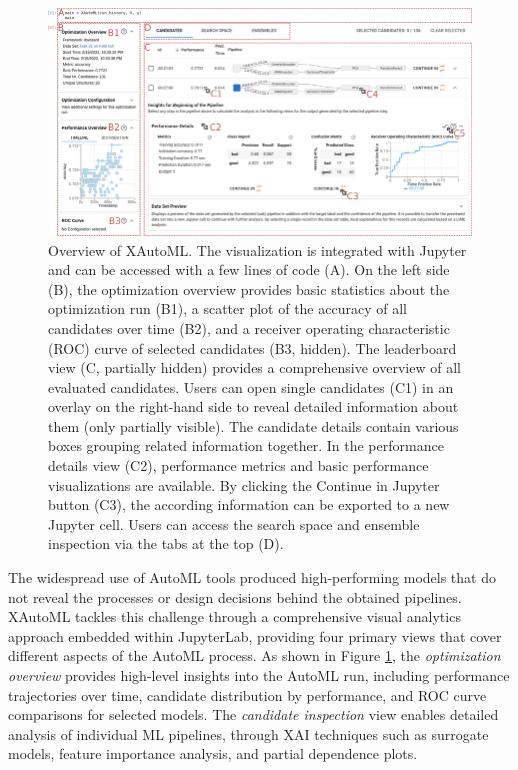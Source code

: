 \begin{figure}[ht!]
\centering
\includegraphics[width=\textwidth]{images/Overview-of-XAutoML-A-The-visualization-is-integrated-with-Jupyter-and-can-be-accessed.png}
\caption{Overview of XAutoML. The visualization is integrated with Jupyter and can be accessed with a few lines of code (A). On the
left side (B), the optimization overview provides basic statistics about the optimization run (B1), a scatter plot of the accuracy of all
candidates over time (B2), and a receiver operating characteristic (ROC) curve of selected candidates (B3, hidden). The leaderboard
view (C, partially hidden) provides a comprehensive overview of all evaluated candidates. Users can open single candidates (C1) in
an overlay on the right-hand side to reveal detailed information about them (only partially visible). The candidate details contain
various boxes grouping related information together. In the performance details view (C2), performance metrics and basic performance
visualizations are available. By clicking the Continue in Jupyter button (C3), the according information can be exported to a new
Jupyter cell. Users can access the search space and ensemble inspection via the tabs at the top (D).}

\label{fig:xautoml_overview}
\end{figure}

The widespread use of AutoML tools produced high-performing models that do not reveal the processes or design decisions behind the obtained pipelines.
XAutoML tackles this challenge through a comprehensive visual analytics approach embedded within JupyterLab, providing four primary views that cover different aspects of the AutoML process. As shown in Figure \ref{fig:xautoml_overview}, the \textit{optimization overview} provides high-level insights into the AutoML run, including performance trajectories over time, candidate distribution by performance, and ROC curve comparisons for selected models. The \textit{candidate inspection} view enables detailed analysis of individual ML pipelines, through XAI techniques such as surrogate models, feature importance analysis, and partial dependence plots.

